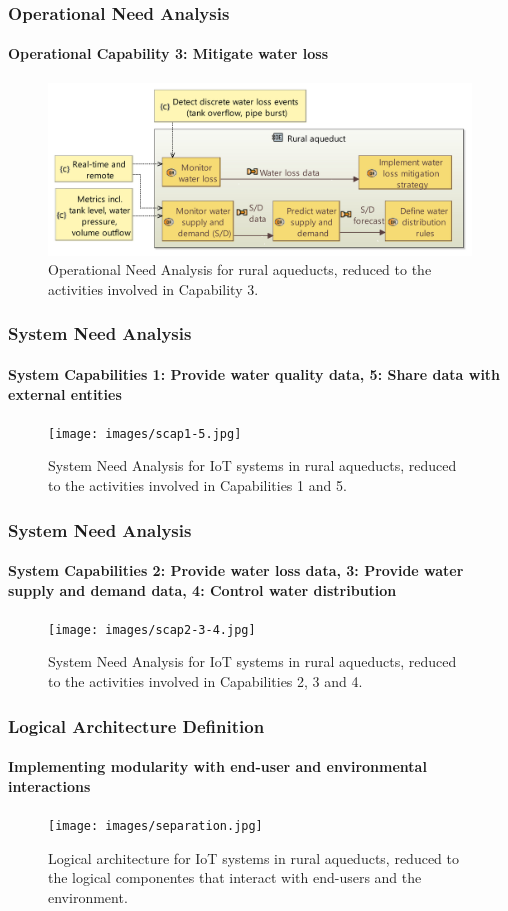 \documentclass{beamer}
\begin{document}
\begin{frame}
    \frametitle{\small Operational Need Analysis}
    \framesubtitle{Operational Capability 3: Mitigate water loss}

    \begin{figure}
        \centering
        \includegraphics[width=\textwidth]{images/opcap3.jpg}
        \caption{Operational Need Analysis for rural aqueducts, reduced to the activities involved in Capability 3.}
    \end{figure}
\end{frame}

\begin{frame}
    \frametitle{\small System Need Analysis}
    \framesubtitle{System Capabilities 1: Provide water quality data, 5: Share data with external entities}

    \begin{figure}
        \centering
        \texttt{[image: images/scap1-5.jpg]}
        \caption{System Need Analysis for IoT systems in rural aqueducts, reduced to the activities involved in Capabilities 1 and 5.}
    \end{figure}
\end{frame}

\begin{frame}
    \frametitle{\small System Need Analysis}
    \framesubtitle{System Capabilities 2: Provide water loss data, 3: Provide water supply and demand data, 4: Control water distribution}

    \begin{figure}
        \centering
        \texttt{[image: images/scap2-3-4.jpg]}
        \caption{System Need Analysis for IoT systems in rural aqueducts, reduced to the activities involved in Capabilities 2, 3 and 4.}
    \end{figure}
\end{frame}

\begin{frame}
    \frametitle{\small Logical Architecture Definition}
    \framesubtitle{Implementing modularity with end-user and environmental interactions}

    \begin{figure}
        \centering
        \texttt{[image: images/separation.jpg]}
        \caption{Logical architecture for IoT systems in rural aqueducts, reduced to the logical componentes that interact with end-users and the environment.}
    \end{figure}
\end{frame}
\end{document}

